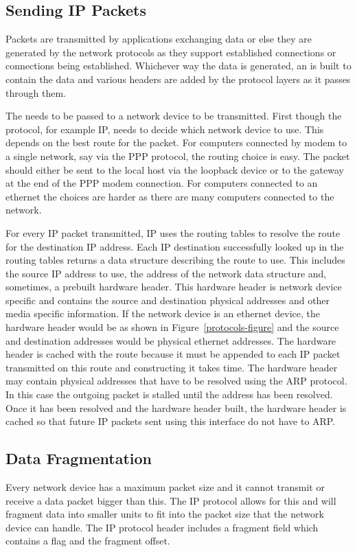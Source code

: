 \subsection{Sending IP Packets}
Packets are transmitted by applications exchanging data or else they are generated by
the network protocols as they support established connections or connections being
established.
Whichever way the data is generated, an  is built to contain the data
and various headers are added by  the protocol layers as it passes through them.

The  needs to be passed to a network device to be transmitted.
First though the protocol, for example IP,  needs to decide which network device to
use.
This depends on the best route for the packet.
For computers connected by modem to a single network, say via the PPP protocol, the
routing choice is easy.
The packet should either be sent to the local host via the loopback device or to the 
gateway at the end of the PPP modem connection.
For computers connected to an ethernet the choices are harder as there are many computers
connected to the network.

For every IP packet transmitted, IP uses the routing tables to resolve the route for the
destination IP address.
Each IP destination successfully looked up in the routing tables returns a 
data structure describing the route to use.
This includes the source IP address to use, the address of the network  data
structure and, sometimes, a prebuilt hardware header.
This hardware header is network device specific and contains the source and destination
physical addresses and other media specific information.
If the network device is an ethernet device, the hardware header would be as shown in
Figure~\ref{protocols-figure} and the source and destination addresses would be physical
ethernet addresses.
The hardware header is cached with the route because it must be appended to each IP
packet transmitted on this route and constructing it takes time.
The hardware header may contain physical addresses that have to be resolved using the
ARP protocol.
In this case the outgoing packet is stalled until the address has been resolved.
Once it has been resolved and the hardware header built, the hardware header is cached
so that future IP packets sent using this interface do not have to ARP.

\subsection{Data Fragmentation}
Every network device has a maximum packet size and it cannot transmit or receive a 
data packet bigger than this.
The IP protocol allows for this and will fragment data into smaller units to fit into 
the packet size that the network device can handle.
The IP protocol header includes a fragment field which contains a flag and the fragment
offset.

